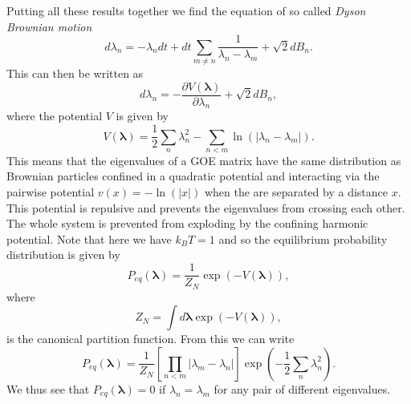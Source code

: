 \documentclass[11pt]{report}
\begin{document}
Putting all these results together we find the equation of so called {\em Dyson Brownian motion}
\begin{equation}
d\lambda_n = -\lambda_n dt + dt \sum_{m\neq n} \frac{1}{\lambda_n-\lambda_m}
+\sqrt{2}dB_n.
\end{equation}
This can then be written as
\begin{equation}
d\lambda_n = -\frac{\partial V(\boldsymbol{\lambda})}{\partial \lambda_n}
+\sqrt{2}dB_n,
\end{equation}
where the potential $V$ is given by
\begin{equation}
V(\boldsymbol{\lambda})=\frac{1}{2}\sum_{n}\lambda_n^2 - \sum_{n<m}\ln(|\lambda_n-\lambda_m|).
\end{equation}
This means that the eigenvalues of a GOE matrix have the same distribution as Brownian particles confined in a quadratic potential and interacting via the pairwise potential $v(x)= -\ln(|x|)$ when the are separated by a distance $x$. This potential is repulsive and prevents the eigenvalues from crossing each other. The whole system is prevented from exploding by the confining harmonic potential.
Note that here we have $k_BT=1$ and so the equilibrium probability distribution is given by
 \begin{equation}
 P_{eq}(\boldsymbol{\lambda})=\frac{1}{Z_N}\exp(-V(\boldsymbol{\lambda})),
 \end{equation}
 where 
 \begin{equation}
 Z_N= \int d\boldsymbol{\lambda}\exp(-V(\boldsymbol{\lambda})),
 \end{equation}
 is the canonical partition function.
 From this we can write
 \begin{equation}
 P_{eq}(\boldsymbol{\lambda})=\frac{1}{Z_N}[\prod_{n<m}|\lambda_m-\lambda_n|]\exp(-\frac{1}{2}\sum_n \lambda_n^2).
 \end{equation}
 We thus see that $P_{eq}(\boldsymbol{\lambda})=0$ if $\lambda_n=\lambda_m$ for any pair of different eigenvalues.
 
\end{document}
